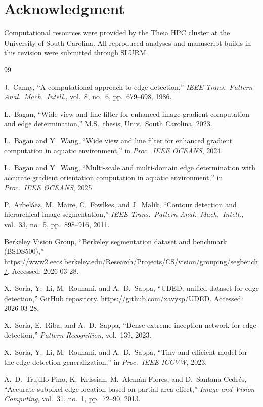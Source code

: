 \documentclass[conference]{IEEEtran}
\begin{document}
\section*{Acknowledgment}
Computational resources were provided by the Theia HPC cluster at the University of South Carolina. All reproduced analyses and manuscript builds in this revision were submitted through SLURM.

\begin{thebibliography}{99}

J.~Canny, ``A computational approach to edge detection,'' \textit{IEEE Trans.\ Pattern Anal.\ Mach.\ Intell.}, vol.~8, no.~6, pp.~679--698, 1986.

L.~Bagan, ``Wide view and line filter for enhanced image gradient computation and edge determination,'' M.S.\ thesis, Univ.\ South Carolina, 2023.

L.~Bagan and Y.~Wang, ``Wide view and line filter for enhanced gradient computation in aquatic environment,'' in \textit{Proc.\ IEEE OCEANS}, 2024.

L.~Bagan and Y.~Wang, ``Multi-scale and multi-domain edge determination with accurate gradient orientation computation in aquatic environment,'' in \textit{Proc.\ IEEE OCEANS}, 2025.

P.~Arbel\'{a}ez, M.~Maire, C.~Fowlkes, and J.~Malik, ``Contour detection and hierarchical image segmentation,'' \textit{IEEE Trans.\ Pattern Anal.\ Mach.\ Intell.}, vol.~33, no.~5, pp.~898--916, 2011.

Berkeley Vision Group, ``Berkeley segmentation dataset and benchmark (BSDS500),'' \url{https://www2.eecs.berkeley.edu/Research/Projects/CS/vision/grouping/segbench/}. Accessed: 2026-03-28.

X.~Soria, Y.~Li, M.~Rouhani, and A.~D.~Sappa, ``UDED: unified dataset for edge detection,'' GitHub repository. \url{https://github.com/xavysp/UDED}. Accessed: 2026-03-28.

X.~Soria, E.~Riba, and A.~D.~Sappa, ``Dense extreme inception network for edge detection,'' \textit{Pattern Recognition}, vol.~139, 2023.

X.~Soria, Y.~Li, M.~Rouhani, and A.~D.~Sappa, ``Tiny and efficient model for the edge detection generalization,'' in \textit{Proc.\ IEEE ICCVW}, 2023.

A.~D.~Trujillo-Pino, K.~Krissian, M.~Alem\'an-Flores, and D.~Santana-Cedr\'es, ``Accurate subpixel edge location based on partial area effect,'' \textit{Image and Vision Computing}, vol.~31, no.~1, pp.~72--90, 2013.


\end{thebibliography}
\end{document}
